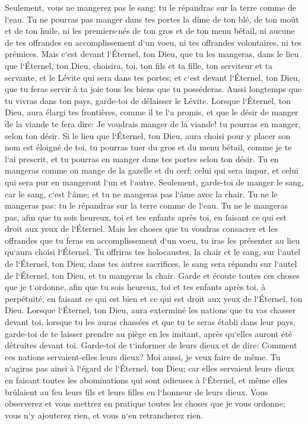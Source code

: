 \verse Seulement, vous ne mangerez pas le sang: tu le répandras sur la terre comme de l`eau. 
\verse Tu ne pourras pas manger dans tes portes la dîme de ton blé, de ton moût et de ton huile, ni les premiers-nés de ton gros et de ton menu bétail, ni aucune de tes offrandes en accomplissement d`un voeu, ni tes offrandes volontaires, ni tes prémices. 
\verse Mais c`est devant l`Éternel, ton Dieu, que tu les mangeras, dans le lieu que l`Éternel, ton Dieu, choisira, toi, ton fils et ta fille, ton serviteur et ta servante, et le Lévite qui sera dans tes portes; et c`est devant l`Éternel, ton Dieu, que tu feras servir à ta joie tous les biens que tu posséderas. 
\verse Aussi longtemps que tu vivras dans ton pays, garde-toi de délaisser le Lévite. 
\verse Lorsque l`Éternel, ton Dieu, aura élargi tes frontières, comme il te l`a promis, et que le désir de manger de la viande te fera dire: Je voudrais manger de la viande! tu pourras en manger, selon ton désir. 
\verse Si le lieu que l`Éternel, ton Dieu, aura choisi pour y placer son nom est éloigné de toi, tu pourras tuer du gros et du menu bétail, comme je te l`ai prescrit, et tu pourras en manger dans tes portes selon ton désir. 
\verse Tu en mangeras comme on mange de la gazelle et du cerf; celui qui sera impur, et celui qui sera pur en mangeront l`un et l`autre. 
\verse Seulement, garde-toi de manger le sang, car le sang, c`est l`âme; et tu ne mangeras pas l`âme avec la chair. 
\verse Tu ne le mangeras pas: tu le répandras sur la terre comme de l`eau. 
\verse Tu ne le mangeras pas, afin que tu sois heureux, toi et tes enfants après toi, en faisant ce qui est droit aux yeux de l`Éternel. 
\verse Mais les choses que tu voudras consacrer et les offrandes que tu feras en accomplissement d`un voeu, tu iras les présenter au lieu qu`aura choisi l`Éternel. 
\verse Tu offriras tes holocaustes, la chair et le sang, sur l`autel de l`Éternel, ton Dieu; dans tes autres sacrifices, le sang sera répandu sur l`autel de l`Éternel, ton Dieu, et tu mangeras la chair. 
\verse Garde et écoute toutes ces choses que je t`ordonne, afin que tu sois heureux, toi et tes enfants après toi, à perpétuité, en faisant ce qui est bien et ce qui est droit aux yeux de l`Éternel, ton Dieu. 
\verse Lorsque l`Éternel, ton Dieu, aura exterminé les nations que tu vas chasser devant toi, lorsque tu les auras chassées et que tu te seras établi dans leur pays, 
\verse garde-toi de te laisser prendre au piège en les imitant, après qu`elles auront été détruites devant toi. Garde-toi de t`informer de leurs dieux et de dire: Comment ces nations servaient-elles leurs dieux? Moi aussi, je veux faire de même. 
\verse Tu n`agiras pas ainsi à l`égard de l`Éternel, ton Dieu; car elles servaient leurs dieux en faisant toutes les abominations qui sont odieuses à l`Éternel, et même elles brûlaient au feu leurs fils et leurs filles en l`honneur de leurs dieux. 
\verse Vous observerez et vous mettrez en pratique toutes les choses que je vous ordonne; vous n`y ajouterez rien, et vous n`en retrancherez rien. 

